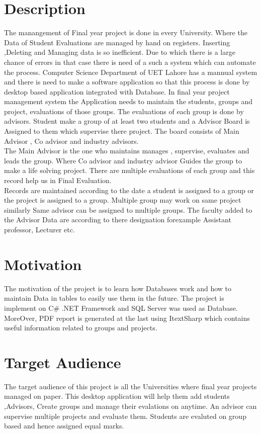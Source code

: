 \documentclass[a4paper, 12pt, oneside]{uet_thesis}
\begin{document}
\section{Description}
The manangement of Final year project is done in every University. Where the Data of Student Evaluations are managed by hand on registers. Inserting ,Deleting and Managing data is so inefficient. Due to which there is a large chance of errors in that case there is need of a such a system which can automate the process. Computer Science Department of UET Lahore has a mannual system and there is need to make a software application so that this process is done by desktop based application integrated with Database. In final year project management system the Application needs to maintain the students, groups and project, evaluations of those groups. The evaluations of each group is done by advisors. Student make a group of at least two students and a Advisor Board is Assigned to them which supervise there project. The board consists of Main Advisor , Co advisor  and industry advisors.\\
The Main Advisor is the one who maintains manages , supervise, evaluates and leads the group. Where Co advisor and industry advisor Guides the group to make a life solving project. There are multiple evaluations of each group and this record help us in Final Evaluation. \\
Records are maintained according to the date a student is assigned to a group or the project is assigned to a group. Multiple group may work on same project similarly Same advisor can be assigned to multiple groups. The faculty added to the Advisor Data are according to there designation forexample Assistant professor, Lecturer etc.  


\section{Motivation}
The motivation of the project is to learn how Databases work and how to maintain Data in tables to easily use them in the future. The project is implement on C# .NET Framework  and SQL Server was used as Database. MoreOver, PDF report is generated at the last using ItextSharp which contains useful information related to groups and projects.  


\section{Target Audience}
The target audience of this project is all the Universities where final year projects 
managed on paper. This desktop application will help them add students ,Advisors, Create groups and manage their evalations on anytime. An advisor can supervise multiple projects and evaluate them. Students are evaluted on group based and hence assigned equal marks.
\clearpage
\end{document}
